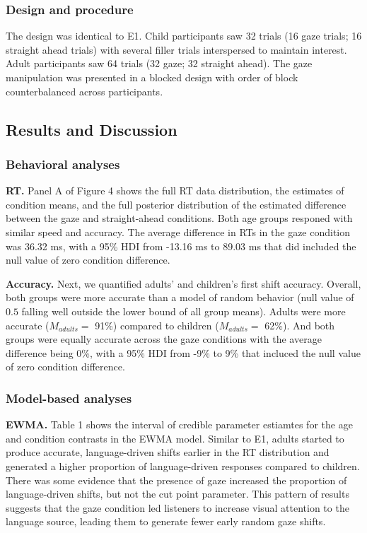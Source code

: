 \documentclass[10pt, letterpaper]{article}
\begin{document}
\subsubsection{Design and procedure}\label{design-and-procedure-1}

The design was identical to E1. Child participants saw 32 trials (16
gaze trials; 16 straight ahead trials) with several filler trials
interspersed to maintain interest. Adult participants saw 64 trials (32
gaze; 32 straight ahead). The gaze manipulation was presented in a
blocked design with order of block counterbalanced across participants.

\subsection{Results and Discussion}\label{results-and-discussion-1}

\subsubsection{Behavioral analyses}\label{behavioral-analyses-1}

\textbf{RT.} Panel A of Figure 4 shows the full RT data distribution,
the estimates of condition means, and the full posterior distribution of
the estimated difference between the gaze and straight-ahead conditions.
Both age groups responed with similar speed and accuracy. The average
difference in RTs in the gaze condition was 36.32 ms, with a 95\% HDI
from -13.16 ms to 89.03 ms that did included the null value of zero
condition difference.

\textbf{Accuracy.} Next, we quantified adults' and children's first
shift accuracy. Overall, both groups were more accurate than a model of
random behavior (null value of \(0.5\) falling well outside the lower
bound of all group means). Adults were more accurate (\(M_{adults} =\)
91\%) compared to children (\(M_{adults} =\) 62\%). And both groups were
equally accurate across the gaze conditions with the average difference
being 0\%, with a 95\% HDI from -9\% to 9\% that incluced the null value
of zero condition difference.

\subsubsection{Model-based analyses}\label{model-based-analyses-1}

\textbf{EWMA.} Table 1 shows the interval of credible parameter
estiamtes for the age and condition contrasts in the EWMA model. Similar
to E1, adults started to produce accurate, language-driven shifts
earlier in the RT distribution and generated a higher proportion of
language-driven responses compared to children. There was some evidence
that the presence of gaze increased the proportion of language-driven
shifts, but not the cut point parameter. This pattern of results
suggests that the gaze condition led listeners to increase visual
attention to the language source, leading them to generate fewer early
random gaze shifts.
\end{document}
